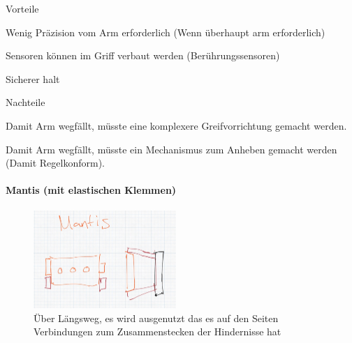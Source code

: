 \begin{minipage}[t]{0.48\textwidth}
    \begin{items}
          \item [Vorteile]
          \item Wenig Präzision vom Arm erforderlich (Wenn überhaupt arm erforderlich)
          \item Sensoren können im Griff verbaut werden (Berührungssensoren)
          \item Sicherer halt
    \end{items}
\end{minipage}
\hfill
\begin{minipage}[t]{0.48\textwidth}
    \begin{items}
          \item [Nachteile]
          \item Damit Arm wegfällt, müsste eine komplexere Greifvorrichtung gemacht werden.
          \item Damit Arm wegfällt, müsste ein Mechanismus zum Anheben gemacht werden (Damit Regelkonform).
    \end{items}
\end{minipage}
\paragraph{Mantis (mit elastischen Klemmen)}
\begin{figure}[h!]
        \centering
        \includegraphics[width=0.48\textwidth]{img/technologierecherche/Aufnahme/Mantis.jpg}
        \caption{Über Längsweg, es wird ausgenutzt das es auf den Seiten Verbindungen zum Zusammenstecken der Hindernisse hat}
        \label{img:tech_Mantis}
\end{figure}

